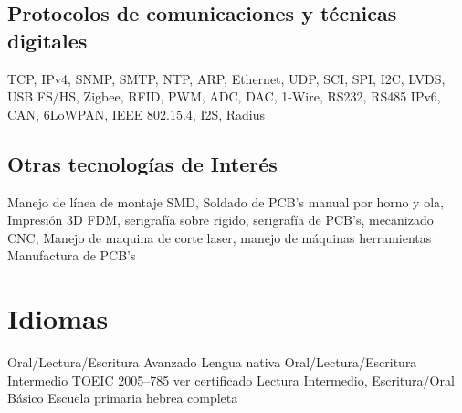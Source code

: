 \documentclass[11pt,a4paper,sans]{moderncv}  %
\begin{document}
   \subsection{Protocolos de comunicaciones y técnicas digitales}
       {TCP, IPv4, SNMP, SMTP, NTP, ARP, Ethernet, UDP, SCI, SPI, I2C, LVDS, USB FS/HS, Zigbee, RFID, PWM, ADC, DAC, 1-Wire, RS232, RS485}
     {IPv6, CAN, 6LoWPAN, IEEE 802.15.4, I2S, Radius}
      {}
   
   \subsection{Otras tecnologías de Interés}
       {Manejo de línea de montaje SMD, Soldado de PCB's manual por horno y ola, Impresión 3D FDM, serigrafía sobre rigido, serigrafía de PCB's,  mecanizado CNC, Manejo de maquina de corte laser, manejo de máquinas herramientas}
     {Manufactura de PCB's}
      {}

\section{Idiomas}
 { Oral/Lectura/Escritura Avanzado}           { Lengua nativa}
  { Oral/Lectura/Escritura Intermedio}         { TOEIC 2005--785 \href { http://disenioconingenio.com.ar/producto.php?products_id=390} { ver certificado}}
  { Lectura Intermedio, Escritura/Oral Básico} { Escuela primaria hebrea completa}
\end{document}
